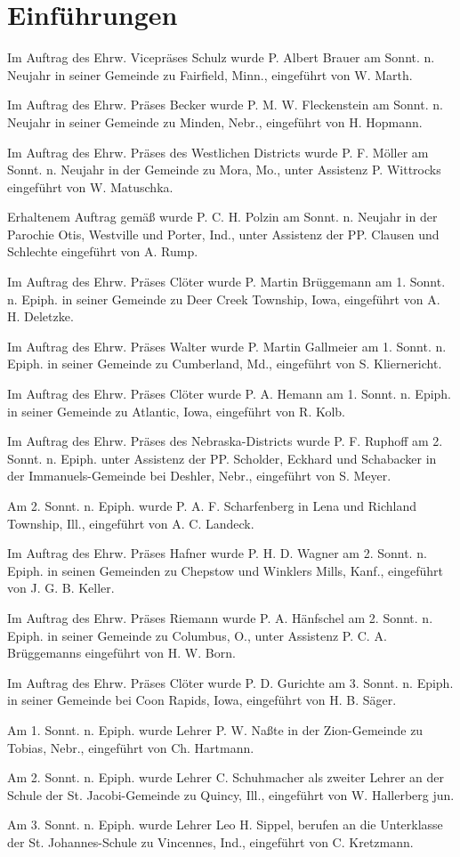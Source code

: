 \chapter{Einführungen}

Im Auftrag des Ehrw. Vicepräses Schulz wurde P. Albert Brauer am Sonnt. n. Neujahr in seiner Gemeinde zu Fairfield, Minn., eingeführt von W. Marth.

Im Auftrag des Ehrw. Präses Becker wurde P. M. W. Fleckenstein am Sonnt. n. Neujahr in seiner Gemeinde zu Minden, Nebr., eingeführt von H. Hopmann.

Im Auftrag des Ehrw. Präses des Westlichen Districts wurde P. F. Möller am Sonnt. n. Neujahr in der Gemeinde zu Mora, Mo., unter Assistenz P. Wittrocks eingeführt von W. Matuschka.

Erhaltenem Auftrag gemäß wurde P. C. H. Polzin am Sonnt. n. Neujahr in der Parochie Otis, Westville und Porter, Ind., unter Assistenz der PP. Clausen und Schlechte eingeführt von A. Rump.

Im Auftrag des Ehrw. Präses Clöter wurde P. Martin Brüggemann am 1. Sonnt. n. Epiph. in seiner Gemeinde zu Deer Creek Township, Iowa, eingeführt von A. H. Deletzke.

Im Auftrag des Ehrw. Präses Walter wurde P. Martin Gallmeier am 1. Sonnt. n. Epiph. in seiner Gemeinde zu Cumberland, Md., eingeführt von S. Kliernericht.

Im Auftrag des Ehrw. Präses Clöter wurde P. A. Hemann am 1. Sonnt. n. Epiph. in seiner Gemeinde zu Atlantic, Iowa, eingeführt von R. Kolb.

Im Auftrag des Ehrw. Präses des Nebraska-Districts wurde P. F. Ruphoff am 2. Sonnt. n. Epiph. unter Assistenz der PP. Scholder, Eckhard und Schabacker in der Immanuels-Gemeinde bei Deshler, Nebr., eingeführt von S. Meyer.

Am 2. Sonnt. n. Epiph. wurde P. A. F. Scharfenberg in Lena und Richland Township, Ill., eingeführt von A. C. Landeck.

Im Auftrag des Ehrw. Präses Hafner wurde P. H. D. Wagner am 2. Sonnt. n. Epiph. in seinen Gemeinden zu Chepstow und Winklers Mills, Kanf., eingeführt von J. G. B. Keller.

Im Auftrag des Ehrw. Präses Riemann wurde P. A. Hänfschel am 2. Sonnt. n. Epiph. in seiner Gemeinde zu Columbus, O., unter Assistenz P. C. A. Brüggemanns eingeführt von H. W. Born.

Im Auftrag des Ehrw. Präses Clöter wurde P. D. Gurichte am 3. Sonnt. n. Epiph. in seiner Gemeinde bei Coon Rapids, Iowa, eingeführt von H. B. Säger.

Am 1. Sonnt. n. Epiph. wurde Lehrer P. W. Naßte in der Zion-Gemeinde zu Tobias, Nebr., eingeführt von Ch. Hartmann.

Am 2. Sonnt. n. Epiph. wurde Lehrer C. Schuhmacher als zweiter Lehrer an der Schule der St. Jacobi-Gemeinde zu Quincy, Ill., eingeführt von W. Hallerberg jun.

Am 3. Sonnt. n. Epiph. wurde Lehrer Leo H. Sippel, berufen an die Unterklasse der St. Johannes-Schule zu Vincennes, Ind., eingeführt von C. Kretzmann.
